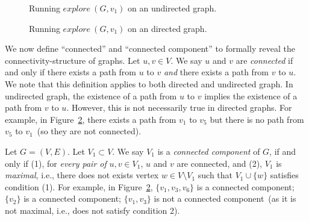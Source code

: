 

\begin{figure}[h!]
\centering{}
\caption{Running $explore~(G, v_1)$ on an undirected graph.}
\label{fig:explore-undirected}
\end{figure}

\begin{figure}[h!]
\centering{}
\caption{Running $explore~(G, v_1)$ on an directed graph.}
\label{fig:explore-directed}
\end{figure}

We now define ``connected'' and ``connected component'' to formally reveal the connectivity-structure of graphs.
Let $u,v\in V$. We say $u$ and $v$ are \emph{connected} if and only if there exists a path from $u$ to $v$
\emph{and} there exists a path from $v$ to $u$. 
We note that this definition applies to both directed and undirected graph.
In undirected graph, the existence of a path from $u$ to $v$ implies the
existence of a path from $v$ to $u$. However, this is not necessarily true in directed
graphs. For example, in Figure~\ref{fig:explore-directed}, there exists a path from $v_1$ to $v_5$ but there is no path
from $v_5$ to $v_1$~(so they are not connected).

Let $G = (V, E)$. Let $V_1\subset V$. We say $V_1$ is a \emph{connected component} of $G$,
if and only if (1), for \emph{every pair of} $u,v\in V_1$, $u$ and $v$ are connected,
and (2), $V_1$ is \emph{maximal}, i.e., there does not exists vertex $w\in V\setminus V_1$ such
that $V_1\cup \{w\}$ satisfies condition (1).
For example, in Figure~\ref{fig:explore-directed}, $\{v_1, v_3, v_6\}$ is a connected component;
$\{v_2\}$ is a connected component; 
$\{v_1, v_3\}$ is not a connected component~(as it is not maximal, i.e., does not satisfy condition 2). 

